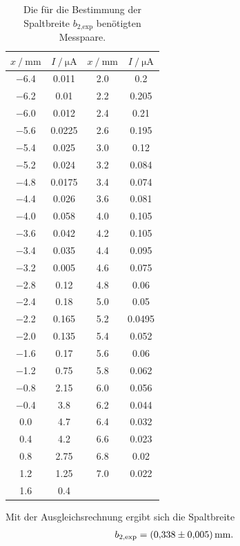 \begin{table}
\centering
\caption{Die für die Bestimmung der Spaltbreite $b_\text{2,exp}$ benötigten Messpaare.}
\label{tab:einzel2}
\begin{tabular}{c c c c}
\toprule
$x\:/\: \si{\milli\meter}$ & $I\:/\: \si{\micro\ampere}$ &
$x\:/\: \si{\milli\meter}$ & $I\:/\: \si{\micro\ampere}$ \\
\midrule
\num{-6.4} & 0.011 & \num{2.0}  & 0.2 \\
\num{-6.2} & 0.01 & \num{2.2}   & 0.205 \\
\num{-6.0} & 0.012 & \num{2.4}  & 0.21 \\
\num{-5.6} & 0.0225 & \num{2.6} & 0.195 \\
\num{-5.4} & 0.025 & \num{3.0}  & 0.12 \\
\num{-5.2} & 0.024 & \num{3.2}  & 0.084 \\
\num{-4.8} & 0.0175 & \num{3.4} & 0.074 \\
\num{-4.4} & 0.026 & \num{3.6}  & 0.081 \\
\num{-4.0} & 0.058 & \num{4.0}  & 0.105 \\
\num{-3.6} & 0.042 & \num{4.2}  & 0.105 \\
\num{-3.4} & 0.035 & \num{4.4}  & 0.095 \\
\num{-3.2} & 0.005 & \num{4.6}  & 0.075 \\
\num{-2.8} & 0.12 & \num{4.8}   & 0.06 \\
\num{-2.4} & 0.18 & \num{5.0}   & 0.05 \\
\num{-2.2} & 0.165 & \num{5.2}  & 0.0495 \\
\num{-2.0} & 0.135 & \num{5.4}  & 0.052 \\
\num{-1.6} & 0.17 & \num{5.6}   & 0.06 \\
\num{-1.2} & 0.75 & \num{5.8}   & 0.062 \\
\num{-0.8} & 2.15 & \num{6.0}   & 0.056 \\
\num{-0.4} & 3.8 & \num{6.2}    & 0.044 \\
\num{0.0}  & 4.7  & \num{6.4}   & 0.032 \\
\num{0.4}  & 4.2  & \num{6.6}   & 0.023 \\
\num{0.8}  & 2.75  & \num{6.8}  & 0.02 \\
\num{1.2}  & 1.25  & \num{7.0}  & 0.022 \\
\num{1.6}  & 0.4  & & \\
\bottomrule
\end{tabular}
\end{table}

\noindent Mit der Ausgleichsrechnung ergibt sich die Spaltbreite
\begin{align*}
b_\text{2,exp} &= (\num{0.338 +- 0.005}) \,\si{\milli\meter}.
\end{align*}
